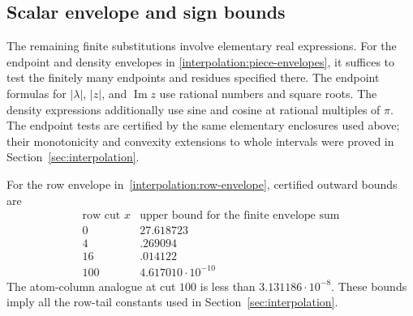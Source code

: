 \subsection{Scalar envelope and sign bounds}\label{cert:scalar-bounds}

The remaining finite substitutions involve elementary real expressions.
For the endpoint and density envelopes in
\eqref{interpolation:piece-envelopes}, it suffices to test the finitely
many endpoints and residues specified there.  The endpoint formulas
for $|\lambda|$, $|z|$, and $\operatorname{Im}z$ use rational numbers and
square roots.  The density expressions additionally use sine and cosine
at rational multiples of $\pi$.  The endpoint tests are certified by
the same elementary enclosures used above; their monotonicity and
convexity extensions to whole intervals were proved in
Section~\ref{sec:interpolation}.

For the row envelope in~\eqref{interpolation:row-envelope}, certified
outward bounds are
\begin{equation}\label{cert:row-substitutions}
\begin{array}{c|c}
 \text{row cut }x&\text{upper bound for the finite envelope sum}\\ \hline
 0&27.618723\\
 4&.269094\\
 16&.014122\\
 100&4.617010\cdot10^{-10}
\end{array}
\end{equation}
The atom-column analogue at cut $100$ is less than
$3.131186\cdot10^{-8}$.  These bounds imply all the row-tail constants
used in Section~\ref{sec:interpolation}.


